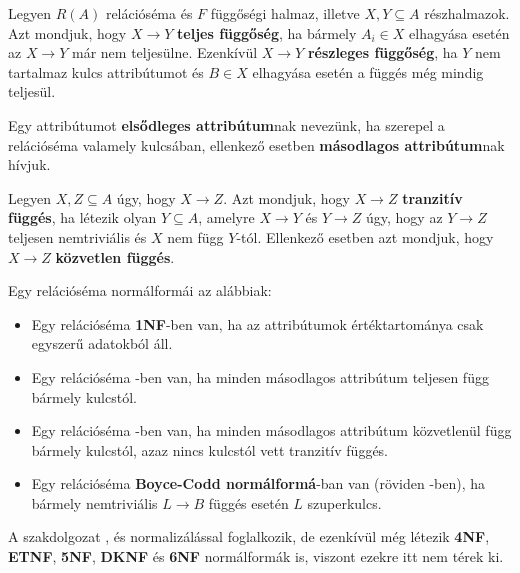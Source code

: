 \begin{defi}
Legyen $R(A)$ relációséma és $F$ függőségi halmaz, illetve $X,Y \subseteq A$ részhalmazok. Azt mondjuk, hogy $X \longrightarrow Y$ \textbf{teljes függőség}, ha bármely $A_i \in X$ elhagyása esetén az $X \longrightarrow Y$ már nem teljesülne. Ezenkívül $X \longrightarrow Y$ \textbf{részleges függőség}, ha $Y$ nem tartalmaz kulcs attribútumot és $B \in X$ elhagyása esetén a függés még mindig teljesül.
\end{defi}

\begin{defi}
Egy attribútumot \textbf{elsődleges attribútum}nak nevezünk, ha szerepel a relációséma valamely kulcsában, ellenkező esetben \textbf{másodlagos attribútum}nak hívjuk.
\end{defi}

\begin{defi}
Legyen $X,Z \subseteq A$ úgy, hogy $X \rightarrow Z$. Azt mondjuk, hogy $X \longrightarrow Z$ \textbf{tranzitív függés}, ha létezik olyan $Y \subseteq A$, amelyre $X \longrightarrow Y$ és $Y \longrightarrow Z$ úgy, hogy az $Y \longrightarrow Z$ teljesen nemtriviális és $X$ nem függ $Y$-tól. Ellenkező esetben azt mondjuk, hogy $X \longrightarrow Z$ \textbf{közvetlen függés}.
\end{defi}

\begin{defi}[Normálformák]
Egy relációséma normálformái az alábbiak:
\begin{itemize}
    \item Egy relációséma \textbf{1NF}-ben van, ha az attribútumok értéktartománya csak egyszerű adatokból áll.
    \item Egy relációséma \nfk-ben van, ha minden másodlagos attribútum teljesen függ bármely kulcstól.
    \item Egy relációséma \nfh-ben van, ha minden másodlagos attribútum közvetlenül függ bármely kulcstól, azaz nincs kulcstól vett tranzitív függés.
    \item Egy relációséma \textbf{Boyce-Codd normálformá}-ban van (röviden \BCNF-ben), ha bármely nemtriviális $L \longrightarrow B$ függés esetén $L$ szuperkulcs.
\end{itemize}
\end{defi}

\begin{megj}
A szakdolgozat \nfk, \nfh és \BCNF normalizálással foglalkozik, de ezenkívül még létezik \textbf{4NF}, \textbf{ETNF}, \textbf{5NF}, \textbf{DKNF} és \textbf{6NF} normálformák is, viszont ezekre itt nem térek ki.
\end{megj}

